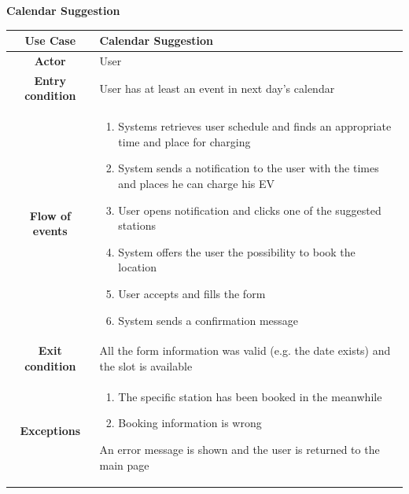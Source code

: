 \documentclass[table, 12pt]{article} %
\begin{document}
\begin{itemize}
            \begin{table}[H]
                \item[] \textbf{Calendar Suggestion}
                \item[]
                \centering
                \begin{tabular}{|c |m{}|}
                    \hline
                    \textbf{Use Case} & Calendar Suggestion\\ \hline
                    \textbf{Actor} & User\\ \hline
                    \textbf{Entry condition} & User has at least an event in next day's calendar \\  \hline
                    \textbf{Flow of events} & \begin{enumerate}
                                                \item Systems retrieves user schedule and finds an appropriate time and place for charging
                                                \item System sends a notification to the user with the times and places he can charge his EV
                                                \item User opens notification and clicks one of the suggested stations
                                                \item System offers the user the possibility to book the location
                                                \item User accepts and fills the form
                                                \item System sends a confirmation message
                                            \end{enumerate}\\ \hline
                    \textbf{Exit condition} &  All the form information was valid (e.g. the date exists) and the slot is available\\ \hline
                    \textbf{Exceptions} &  \begin{enumerate}
                        \item The specific station has been booked in the meanwhile
                        \item Booking information is wrong
                    \end{enumerate}
                    An error message is shown and the user is returned to the main page\\ \hline

\end{tabular}
\end{table}
\end{itemize}
\end{document}
